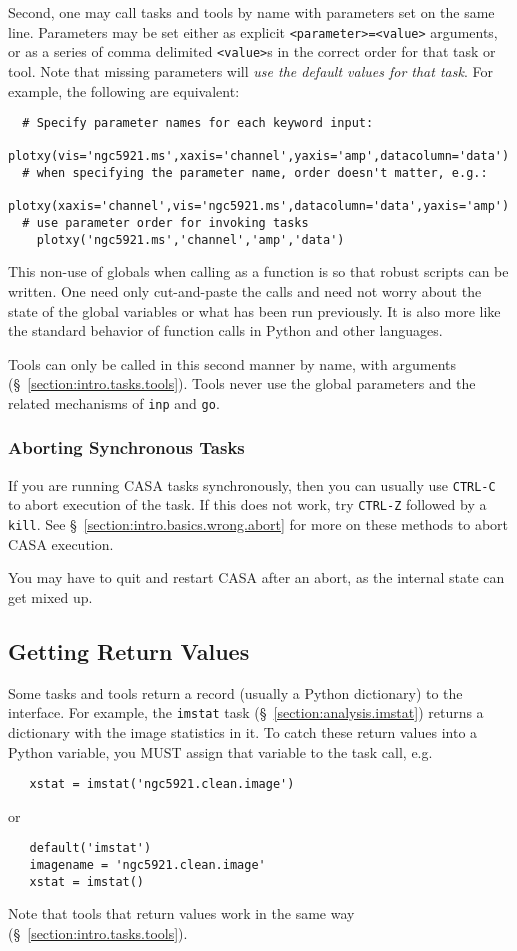 Second, one may call tasks and tools by name with parameters set
on the same line.  Parameters may be set either as explicit
{\tt <parameter>=<value>} arguments, or as a series of comma delimited
{\tt <value>}s in the correct order for that task or tool.  Note that missing
parameters will {\em use the default values for that task}.
For example, the following are equivalent:
\small
\begin{verbatim}
  # Specify parameter names for each keyword input: 
    plotxy(vis='ngc5921.ms',xaxis='channel',yaxis='amp',datacolumn='data')
  # when specifying the parameter name, order doesn't matter, e.g.:
    plotxy(xaxis='channel',vis='ngc5921.ms',datacolumn='data',yaxis='amp')
  # use parameter order for invoking tasks
    plotxy('ngc5921.ms','channel','amp','data')
\end{verbatim}
\normalsize
This non-use of globals when calling as a function is so that robust 
scripts can be written.  One need only cut-and-paste the calls and
need not worry about the state of the global variables or what has
been run previously.  It is also more like the standard behavior of
function calls in Python and other languages.

Tools can only be called in this second manner by name, with
arguments (\S~\ref{section:intro.tasks.tools}).  Tools never use the
global parameters and the related mechanisms of {\tt inp} and {\tt go}.

\subsubsection{Aborting Synchronous Tasks}
\label{section:intro.tasks.run.abort}

If you are running CASA tasks synchronously, then you can usually use
{\tt CTRL-C} to abort execution of the task.  If this does not work,
try {\tt CTRL-Z} followed by a {\tt kill}.
See \S~\ref{section:intro.basics.wrong.abort} for more on these
methods to abort CASA execution.

You may have to quit and restart CASA after an abort, as the internal
state can get mixed up.

\subsection{Getting Return Values}
\label{section:intro.tasks.return}

Some tasks and tools return a record (usually a Python dictionary)
to the interface.  For example, the {\tt imstat} task 
(\S~\ref{section:analysis.imstat}) returns a dictionary with the
image statistics in it.  To catch these return values into a
Python variable, you MUST assign that variable to the task call, e.g.
\small
\begin{verbatim}
   xstat = imstat('ngc5921.clean.image')
\end{verbatim}
\normalsize
or 
\small
\begin{verbatim}
   default('imstat')
   imagename = 'ngc5921.clean.image'
   xstat = imstat()
\end{verbatim}
\normalsize
Note that tools that return values work in the same way
(\S~\ref{section:intro.tasks.tools}).

